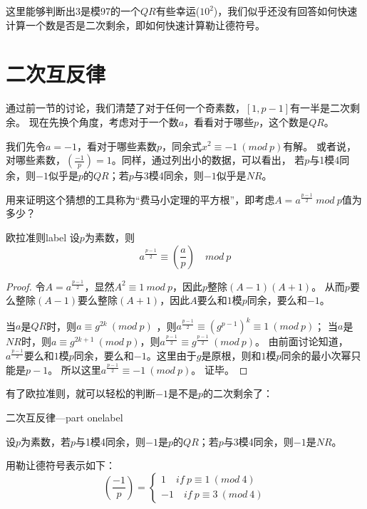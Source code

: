 这里能够判断出3是模97的一个$QR$有些幸运($10^2$)，我们似乎还没有回答如何快速计算一个数是否是二次剩余，即如何快速计算勒让德符号。

\section{二次互反律}
通过前一节的讨论，我们清楚了对于任何一个奇素数，$[1,p-1]$有一半是二次剩余。
现在先换个角度，考虑对于一个数$a$，看看对于哪些$p$，这个数是$QR$。

我们先令$a=-1$，看对于哪些素数$p$，同余式$x^2\equiv -1\ (mod \ p)$有解。
或者说，对哪些素数，$\left( \frac{-1}{p} \right)=1$。同样，通过列出小的数据，可以看出，
{\heiti 若$p$与1模4同余，则$-1$似乎是$p$的$QR$；若$p$与3模4同余，则$-1$似乎是$NR$。}

用来证明这个猜想的工具称为“费马小定理的平方根”，即考虑$A=a^\frac{p-1}{2} \ mod \ p$值为多少？

\begin{theorem}{欧拉准则}{label}
设$p$为素数，则
$$
a^\frac{p-1}{2}\equiv  \left( \frac{a}{p} \right) \quad mod \ p
$$
\end{theorem}

\begin{proof}
令$A=a^\frac{p-1}{2}$，显然$A^2\equiv 1 \ mod \ p$，因此$p$整除$(A-1)(A+1)$。
从而$p$要么整除$(A-1)$要么整除$(A+1)$，因此$A$要么和$1$模$p$同余，要么和$-1$。


当$a$是$QR$时，则$a\equiv g^{2k}\ (mod \ p)$ ，则$a^{\frac{p-1}{2}}\equiv (g^{p-1})^k\equiv 1\ (mod \ p)$；
当$a$是$NR$时，则$a\equiv g^{2k+1} \ (mod \ p)$，则$a^{\frac{p-1}{2}}\equiv g^{\frac{p-1}{2}} \ (mod \ p)$。
由前面讨论知道，$a^{\frac{p-1}{2}}$要么和$1$模$p$同余，要么和$-1$。这里由于$g$是原根，则和$1$模$p$同余的最小次幂只能是$p-1$。
所以这里$a^{\frac{p-1}{2}}\equiv -1 \ (mod \ p)$。
证毕。
\end{proof}


有了欧拉准则，就可以轻松的判断$-1$是不是$p$的二次剩余了：

\begin{theorem}{二次互反律---part one}{label}

设$p$为素数，{\heiti 若$p$与1模4同余，则$-1$是$p$的$QR$；若$p$与3模4同余，则$-1$是$NR$。}

用勒让德符号表示如下：
$$
\left(  \frac{-1}{p}  \right)= \left\{\begin{matrix}
1   \quad if\ p\equiv 1 \ (mod \ 4) \\ 
-1 \quad if\ p\equiv 3 \ (mod \ 4)
\end{matrix}\right.
$$
\end{theorem}

